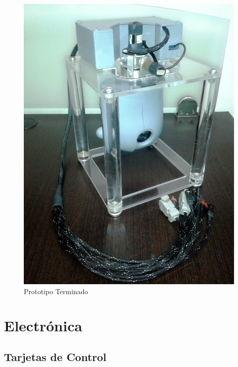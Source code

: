\begin{figure}[H]
\centering \includegraphics[scale=0.11]{img/PrototipoTerminado.jpg}
\caption{Prototipo Terminado}
\label{fig:PrototipoTerminado}
\end{figure} 

\section{Electr\'onica}

\subsection{Tarjetas de Control}

